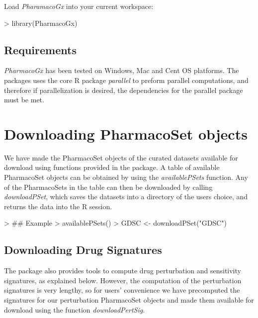 \documentclass[11pt]{article}
\begin{document}
Load \textit{PharamacoGx} into your current workspace:
\begin{Schunk}
\begin{Sinput}
> library(PharmacoGx)
\end{Sinput}
\end{Schunk}

\subsection*{Requirements}

\textit{PharmacoGx} has been tested on Windows, Mac and Cent OS platforms. The packages uses the core R package \textit{parallel} to preform parallel computations, and therefore if parallelization is desired, the dependencies for the parallel package must be met. 

\section{Downloading PharmacoSet objects}

We have made the PharmacoSet objects of the curated datasets available for download using functions provided in the package. A table of available PharmacoSet objects can be obtained by using the \textit{availablePSets} function. Any of the PharmacoSets in the table can then be downloaded by calling \textit{downloadPSet}, which saves the datasets into a directory of the users choice, and returns the data into the R session. 

\begin{Schunk}
\begin{Sinput}
> ## Example
> availablePSets()
> GDSC <- downloadPSet("GDSC") 
\end{Sinput}
\end{Schunk}
\subsection*{Downloading Drug Signatures}

The package also provides tools to compute drug perturbation and sensitivity signatures, as explained below. However, the computation of the perturbation signatures is very lengthy, so for users' convenience we have precomputed the signatures for our perturbation PharmacoSet objects and made them available for download using the function \textit{downloadPertSig}.
\end{document}
